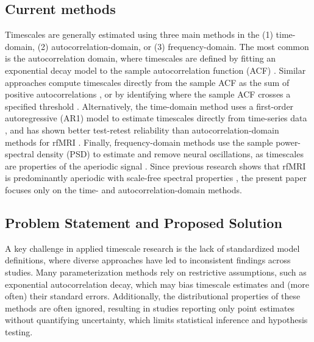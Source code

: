 \documentclass[latex/main.tex]{subfiles}
\begin{document}
\subsection{Current methods}
Timescales are generally estimated using three main methods in the (1) time-domain, (2) autocorrelation-domain, or (3) frequency-domain. The most common is the autocorrelation domain, where timescales are defined by fitting an exponential decay model to the sample autocorrelation function (ACF) \citep{rossi-pool_invariant_2021, cirillo_neural_2018, ito_cortical_2020, runyan_distinct_2017, zeraati_flexible_2022, nougaret_intrinsic_2021, wasmuht_intrinsic_2018, muller_core_2020, maisson_choice-relevant_2021, li_hierarchical_2022, shafiei_topographic_2020}. Similar approaches compute timescales directly from the sample ACF as the sum of positive autocorrelations \citep{wengler_distinct_2020, manea_intrinsic_2022, watanabe_atypical_2019}, or by identifying where the sample ACF crosses a specified threshold \citep{wengler_distinct_2020, zilio_are_2021}. Alternatively, the time-domain method uses a first-order autoregressive (AR1) model to estimate timescales directly from time-series data \citep{kaneoke_variance_2012, meisel_decline_2017, huang_timescales_2018, lurie_cortical_2024, shinn_functional_2023, shafiei_topographic_2020}, and has shown better test-retest reliability than autocorrelation-domain methods for rfMRI \citep{huang_timescales_2018}. Finally, frequency-domain methods use the sample power-spectral density (PSD) to estimate and remove neural oscillations, as timescales are properties of the aperiodic signal \citep{donoghue_parameterizing_2020, gao_neuronal_2020, manea_neural_2024, zeraati_flexible_2022, fallon_timescales_2020}. Since previous research shows that rfMRI is predominantly aperiodic with scale-free spectral properties \citep{he_temporal_2010, he_scale-free_2011}, the present paper focuses only on the time- and autocorrelation-domain methods.

\subsection{Problem Statement and Proposed Solution}
A key challenge in applied timescale research is the lack of standardized model definitions, where diverse approaches have led to inconsistent findings across studies. Many parameterization methods rely on restrictive assumptions, such as exponential autocorrelation decay, which may bias timescale estimates and (more often) their standard errors. Additionally, the distributional properties of these methods are often ignored, resulting in studies reporting only point estimates without quantifying uncertainty, which limits statistical inference and hypothesis testing.\\
\end{document}
